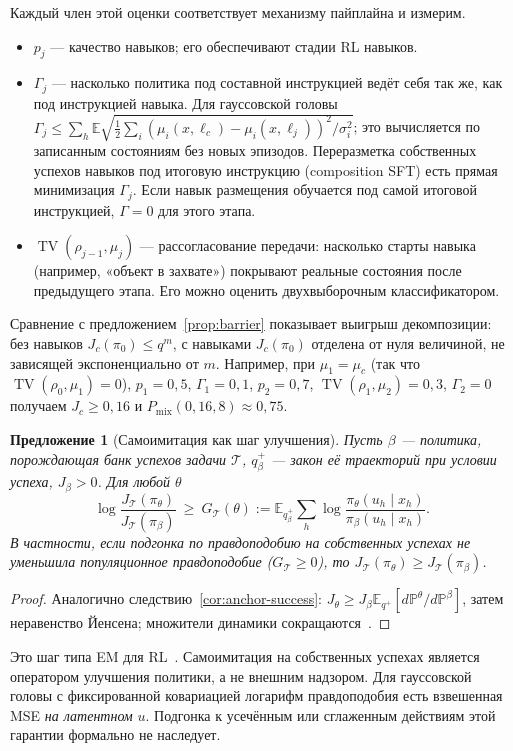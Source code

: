 \documentclass[11pt,a4paper]{article}
\theoremstyle{plain}
\newtheorem{proposition}[theorem]{Предложение}
\theoremstyle{definition}
\theoremstyle{remark}
\newcommand{\E}{\mathbb{E}}
\newcommand{\PP}{\mathbb{P}}
\DeclareMathOperator{\TV}{TV}
\newcommand{\cT}{\mathcal{T}}
\newcommand{\Pmix}{P_{\mathrm{mix}}}
\begin{document}
Каждый член этой оценки соответствует механизму пайплайна и измерим.
\begin{itemize}
\item $p_j$ --- качество навыков; его обеспечивают стадии RL навыков.
\item $\Gamma_j$ --- насколько политика под составной инструкцией ведёт себя так же, как под инструкцией навыка. Для гауссовской головы $\Gamma_j\le\sum_h\E\sqrt{\tfrac12\sum_i(\mu_i(x,\ell_c)-\mu_i(x,\ell_j))^2/\sigma_i^2}$; это вычисляется по записанным состояниям без новых эпизодов. Переразметка собственных успехов навыков под итоговую инструкцию (composition SFT) есть прямая минимизация $\Gamma_j$. Если навык размещения обучается под самой итоговой инструкцией, $\Gamma=0$ для этого этапа.
\item $\TV(\rho_{j-1},\mu_j)$ --- рассогласование передачи: насколько старты навыка (например, «объект в захвате») покрывают реальные состояния после предыдущего этапа. Его можно оценить двухвыборочным классификатором.
\end{itemize}
Сравнение с предложением~\ref{prop:barrier} показывает выигрыш декомпозиции: без навыков $J_c(\pi_0)\le q^m$, с навыками $J_c(\pi_0)$ отделена от нуля величиной, не зависящей экспоненциально от $m$. Например, при $\mu_1=\mu_c$ (так что $\TV(\rho_0,\mu_1)=0$), $p_1=0{,}5$, $\Gamma_1=0{,}1$, $p_2=0{,}7$, $\TV(\rho_1,\mu_2)=0{,}3$, $\Gamma_2=0$ получаем $J_c\ge0{,}16$ и $\Pmix(0{,}16,8)\approx0{,}75$.

\begin{proposition}[Самоимитация как шаг улучшения]\label{prop:sil}
Пусть $\beta$ --- политика, порождающая банк успехов задачи $\cT$, $q^+_\beta$ --- закон её траекторий при условии успеха, $J_\beta>0$. Для любой $\theta$
\[
\log\frac{J_\cT(\pi_\theta)}{J_\cT(\pi_\beta)}\ \ge\ G_\cT(\theta):=\E_{q^+_\beta}\sum_h\log\frac{\pi_\theta(u_h\mid x_h)}{\pi_\beta(u_h\mid x_h)} .
\]
В частности, если подгонка по правдоподобию на собственных успехах не уменьшила популяционное правдоподобие ($G_\cT\ge0$), то $J_\cT(\pi_\theta)\ge J_\cT(\pi_\beta)$.
\end{proposition}
\begin{proof}
Аналогично следствию~\ref{cor:anchor-success}: $J_\theta\ge J_\beta\E_{q^+}[d\PP^\theta/d\PP^\beta]$, затем неравенство Йенсена; множители динамики сокращаются~\cite[\S6]{notes}.
\end{proof}

Это шаг типа EM для RL~\cite{dayan-hinton,rwr}. Самоимитация на собственных успехах является оператором улучшения политики, а не внешним надзором. Для гауссовской головы с фиксированной ковариацией логарифм правдоподобия есть взвешенная MSE \emph{на латентном} $u$. Подгонка к усечённым или сглаженным действиям этой гарантии формально не наследует.
\end{document}
